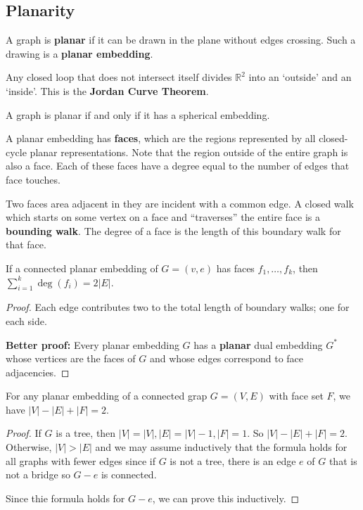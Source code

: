 \documentclass[12pt]{article}
\begin{document}
\subsection{Planarity}
A graph is {\bf planar} if it can be drawn in the plane without edges crossing. Such a drawing is a {\bf planar embedding}.

Any closed loop that does not intersect itself divides $\mathbb{R}^2$ into an `outside' and an `inside'. This is the {\bf Jordan Curve Theorem}.

\begin{theorem}
A graph is planar if and only if it has a spherical embedding.
\end{theorem}

A planar embedding has {\bf faces}, which are the regions represented by all closed-cycle planar representations. Note that the region outside of the entire graph is also a face. Each of these faces have a degree equal to the number of edges that face touches.

Two faces area adjacent in they are incident with a common edge. A closed walk which starts on some vertex on a face and ``traverses'' the entire face is a {\bf bounding walk}. The degree of a face is the length of this boundary walk for that face.

\begin{theorem}
If a connected planar embedding of $G = (v,e)$ has faces $f_1, \dots, f_k$, then $\displaystyle\sum_{i=1}^k \deg(f_i) = 2|E|$.
\end{theorem}

\begin{proof}
Each edge contributes two to the total length of boundary walks; one for each side.

{\bf Better proof:} Every planar embedding $G$ has a {\bf planar} dual embedding $G^*$ whose vertices are the faces of $G$ and whose edges correspond to face adjacencies.
\end{proof}

\begin{theorem}
For any planar embedding of a connected grap $G = (V,E)$ with face set $F$, we have $|V| - |E| + |F| = 2$.
\end{theorem}

\begin{proof}
If $G$ is a tree, then $|V| = |V|, |E| = |V|-1, |F| = 1$. So $|V| - |E| + |F| = 2$. Otherwise, $|V| > |E|$ and we may assume inductively that the formula holds for all graphs with fewer edges since if $G$ is not a tree, there is an edge $e$ of $G$ that is not a bridge so $G-e$ is connected.

Since thie formula holds for $G-e$, we can prove this inductively.
\end{proof}
\end{document}
